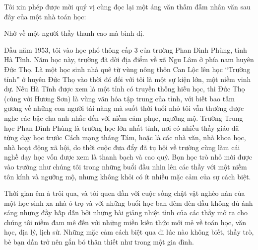 Tôi xin phép được mời quý vị cùng đọc lại một áng văn thấm đẫm nhân văn sau đây của một nhà toán học:

Nhớ về một người thầy thanh cao mà bình dị.

Đầu năm 1953, tôi vào học phổ thông cấp 3 của trường Phan Đình Phùng, tỉnh Hà Tĩnh. Năm học này, trường đã dời địa điểm về xã Ngu Lâm ở phía nam huyên Đức Thọ. Là một học sinh nhà quê từ vùng nông thôn Can Lộc lên học “Trường tỉnh” ở huyên Đức Thọ vào thời đó đối với tôi là một sự kiện lớn, một niềm vinh dự. Nếu Hà Tĩnh được xem là một tỉnh có truyền thống hiếu học, thì Đức Thọ (cùng với Hương Sơn) là vùng văn hóa tập trung của tỉnh, với biết bao tấm gương về những con người tài năng mà suốt thời tuổi nhỏ tôi vẫn thường được nghe các bậc cha anh nhắc đến với niềm cảm phục, ngưỡng mộ. Trường Trung học Phan Đình Phùng là trường học lớn nhất tỉnh, nơi có nhiều thầy giáo đã từng dạy học trước Cách mạng tháng Tám, hoặc là các nhà văn, nhà khoa học, nhà hoạt động xã hội, do thời cuộc đưa đẩy đã tụ hội về trường cùng làm cái nghề dạy học vốn được xem là thanh bạch và cao quý. Bọn học trò nhỏ mới được vào trường như chúng tôi trong những buổi đầu nhìn lên các thầy với một niềm tôn kính và ngưỡng mộ, nhưng không khỏi có ít nhiều mặc cảm của sự cách biệt.


Thời gian êm ả trôi qua, và tôi quen dần với cuộc sống chật vật nghèo nàn của một học sinh xa nhà ỏ trọ và với những buổi học ban đêm đèn dầu không đủ ánh sáng nhưng đầy hấp dẫn bởi những bài giảng nhiệt tình của các thầy mở ra cho chúng tôi niềm đam mê đến với những miền kiến thức mới mẻ về toán học, văn học, địa lý, lịch sử. Những mặc cảm cách biệt qua đi lúc nào không biết, thầy trò, bè bạn dần trở nên gắn bó thân thiết như trong một gia đình.

